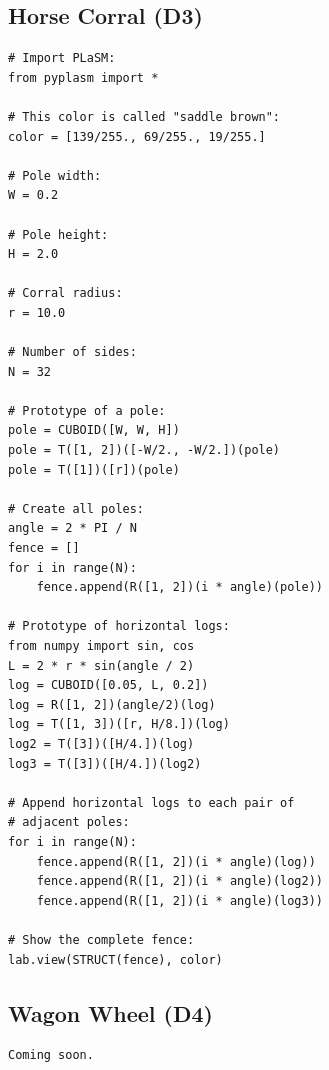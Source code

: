 \documentclass{article}
\begin{document}
\subsection{Horse Corral (D3)}

\begin{verbatim}
# Import PLaSM:
from pyplasm import *

# This color is called "saddle brown":
color = [139/255., 69/255., 19/255.]

# Pole width:
W = 0.2

# Pole height:
H = 2.0

# Corral radius:
r = 10.0

# Number of sides:
N = 32

# Prototype of a pole:
pole = CUBOID([W, W, H])
pole = T([1, 2])([-W/2., -W/2.])(pole)
pole = T([1])([r])(pole)
 
# Create all poles:
angle = 2 * PI / N
fence = []
for i in range(N):
    fence.append(R([1, 2])(i * angle)(pole))
    
# Prototype of horizontal logs:
from numpy import sin, cos
L = 2 * r * sin(angle / 2)
log = CUBOID([0.05, L, 0.2])
log = R([1, 2])(angle/2)(log)
log = T([1, 3])([r, H/8.])(log)  
log2 = T([3])([H/4.])(log)
log3 = T([3])([H/4.])(log2)

# Append horizontal logs to each pair of 
# adjacent poles:
for i in range(N):
    fence.append(R([1, 2])(i * angle)(log))
    fence.append(R([1, 2])(i * angle)(log2))
    fence.append(R([1, 2])(i * angle)(log3))

# Show the complete fence:
lab.view(STRUCT(fence), color)
\end{verbatim}

\subsection{Wagon Wheel (D4)}

\begin{verbatim}
Coming soon.
\end{verbatim}
\end{document}
